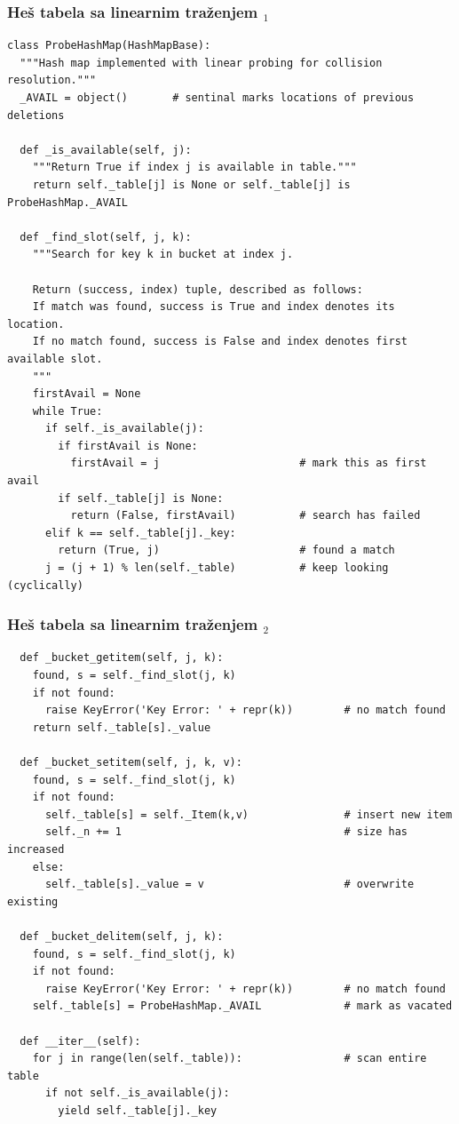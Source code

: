 \documentclass[compress,aspectratio=169]{beamer}
\begin{document}
\begin{frame}[fragile,shrink=25]
  \frametitle{Heš tabela sa linearnim traženjem $_1$}
\begin{verbatim}
class ProbeHashMap(HashMapBase):
  """Hash map implemented with linear probing for collision resolution."""
  _AVAIL = object()       # sentinal marks locations of previous deletions

  def _is_available(self, j):
    """Return True if index j is available in table."""
    return self._table[j] is None or self._table[j] is ProbeHashMap._AVAIL

  def _find_slot(self, j, k):
    """Search for key k in bucket at index j.

    Return (success, index) tuple, described as follows:
    If match was found, success is True and index denotes its location.
    If no match found, success is False and index denotes first available slot.
    """
    firstAvail = None
    while True:                               
      if self._is_available(j):
        if firstAvail is None:
          firstAvail = j                      # mark this as first avail
        if self._table[j] is None:
          return (False, firstAvail)          # search has failed
      elif k == self._table[j]._key:
        return (True, j)                      # found a match
      j = (j + 1) % len(self._table)          # keep looking (cyclically)
\end{verbatim}
\end{frame}

\begin{frame}[fragile,shrink=25]
  \frametitle{Heš tabela sa linearnim traženjem $_2$}
\begin{verbatim}
  def _bucket_getitem(self, j, k):
    found, s = self._find_slot(j, k)
    if not found:
      raise KeyError('Key Error: ' + repr(k))        # no match found
    return self._table[s]._value

  def _bucket_setitem(self, j, k, v):
    found, s = self._find_slot(j, k)
    if not found:
      self._table[s] = self._Item(k,v)               # insert new item
      self._n += 1                                   # size has increased
    else:
      self._table[s]._value = v                      # overwrite existing

  def _bucket_delitem(self, j, k):
    found, s = self._find_slot(j, k)
    if not found:
      raise KeyError('Key Error: ' + repr(k))        # no match found
    self._table[s] = ProbeHashMap._AVAIL             # mark as vacated

  def __iter__(self):
    for j in range(len(self._table)):                # scan entire table
      if not self._is_available(j):
        yield self._table[j]._key
\end{verbatim}
\end{frame}
\end{document}

